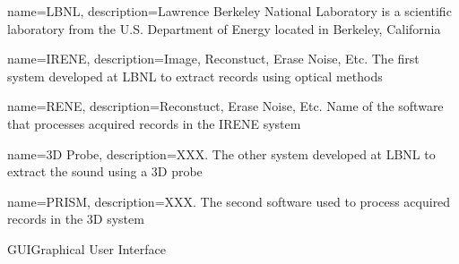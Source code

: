 %

{
  name=LBNL,
  description={Lawrence Berkeley National Laboratory is a scientific laboratory from the U.S. Department of Energy located in Berkeley, California}
}

{
  name=IRENE,
  description={Image, Reconstuct, Erase Noise, Etc. The first system developed at LBNL to extract records using optical methods}
}

{
  name=RENE,
  description={Reconstuct, Erase Noise, Etc. Name of the software that processes acquired records in the IRENE system} %
}

{
  name=3D Probe,
  description={XXX. The other system developed at LBNL to extract the sound using a 3D probe}
}

{
  name=PRISM,
  description={XXX. The second software used to process acquired records in the 3D system}
}

{GUI}{Graphical User Interface}